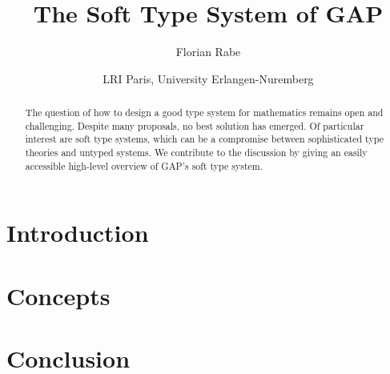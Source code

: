 \documentclass[a4paper]{article}
\begin{document}

\title{The Soft Type System of GAP}
\author{Florian Rabe}
\date{LRI Paris, University Erlangen-Nuremberg}
\maketitle

\begin{abstract}
The question of how to design a good type system for mathematics remains open and challenging.
Despite many proposals, no best solution has emerged.
Of particular interest are soft type systems, which can be a compromise between sophisticated type theories and untyped systems.
We contribute to the discussion by giving an easily accessible high-level overview of GAP's soft type system.
\end{abstract}

\section{Introduction}
  

\section{Concepts}
  
  
%  
  
\section{Conclusion}
  




\end{document}
